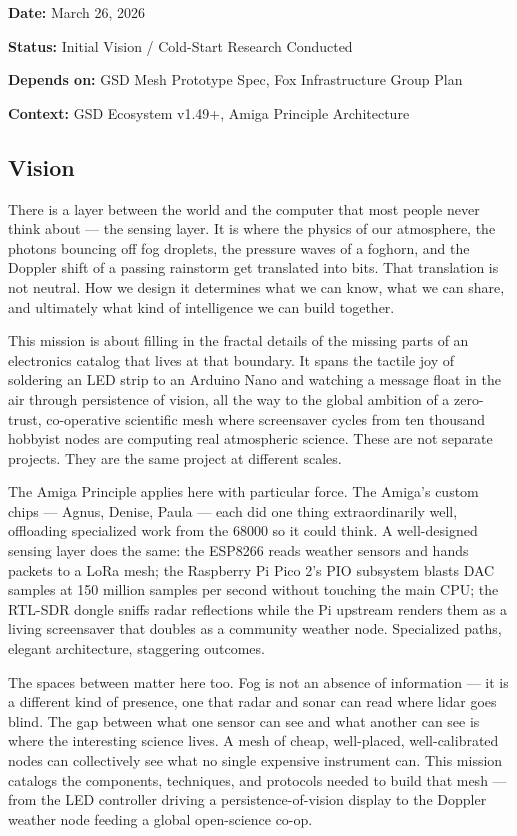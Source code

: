 \documentclass[11pt,letterpaper]{article}
\newcommand{\metafield}[2]{\textbf{\sffamily #1} #2\par}
\begin{document}
\metafield{Date:}{March 26, 2026}
\metafield{Status:}{Initial Vision / Cold-Start Research Conducted}
\metafield{Depends on:}{GSD Mesh Prototype Spec, Fox Infrastructure Group Plan}
\metafield{Context:}{GSD Ecosystem v1.49+, Amiga Principle Architecture}

\subsection{Vision}

There is a layer between the world and the computer that most people never think about --- the sensing layer. It is where the physics of our atmosphere, the photons bouncing off fog droplets, the pressure waves of a foghorn, and the Doppler shift of a passing rainstorm get translated into bits. That translation is not neutral. How we design it determines what we can know, what we can share, and ultimately what kind of intelligence we can build together.

This mission is about filling in the fractal details of the missing parts of an electronics catalog that lives at that boundary. It spans the tactile joy of soldering an LED strip to an Arduino Nano and watching a message float in the air through persistence of vision, all the way to the global ambition of a zero-trust, co-operative scientific mesh where screensaver cycles from ten thousand hobbyist nodes are computing real atmospheric science. These are not separate projects. They are the same project at different scales.

The Amiga Principle applies here with particular force. The Amiga's custom chips --- Agnus, Denise, Paula --- each did one thing extraordinarily well, offloading specialized work from the 68000 so it could think. A well-designed sensing layer does the same: the ESP8266 reads weather sensors and hands packets to a LoRa mesh; the Raspberry Pi Pico 2's PIO subsystem blasts DAC samples at 150 million samples per second without touching the main CPU; the RTL-SDR dongle sniffs radar reflections while the Pi upstream renders them as a living screensaver that doubles as a community weather node. Specialized paths, elegant architecture, staggering outcomes.

The spaces between matter here too. Fog is not an absence of information --- it is a different kind of presence, one that radar and sonar can read where lidar goes blind. The gap between what one sensor can see and what another can see is where the interesting science lives. A mesh of cheap, well-placed, well-calibrated nodes can collectively see what no single expensive instrument can. This mission catalogs the components, techniques, and protocols needed to build that mesh --- from the LED controller driving a persistence-of-vision display to the Doppler weather node feeding a global open-science co-op.
\end{document}
